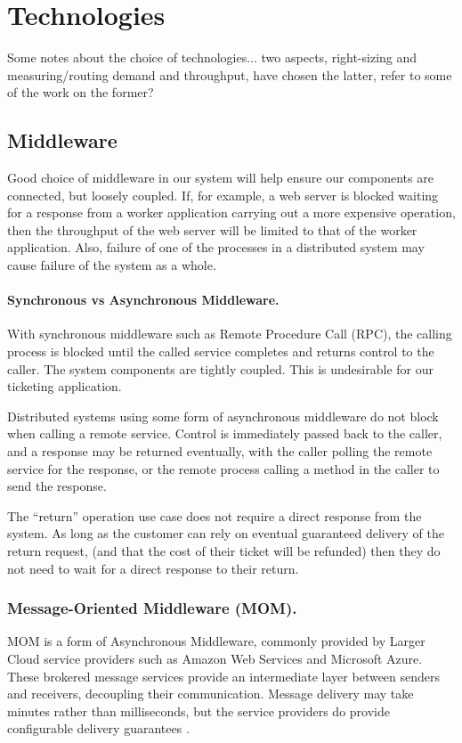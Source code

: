 %
%

\section{Technologies}

Some notes about the choice of technologies... two aspects, right-sizing and measuring/routing demand and throughput, have chosen the latter, refer to some of the work on the former?

%
%

\subsection{Middleware}

Good choice of middleware in our system will help ensure our components are connected, but loosely coupled.  If, for example, a web server is blocked waiting for a response from a worker application carrying out a more expensive operation, then the throughput of the web server will be limited to that of the worker application.  Also, failure of one of the processes in a distributed system may cause failure of the system as a whole.

\paragraph{Synchronous vs Asynchronous Middleware.}
With synchronous middleware such as Remote Procedure Call (RPC), the calling process is blocked until the called service completes and returns control to the caller.  The system components are tightly coupled.  This is undesirable for our ticketing application.

Distributed systems using some form of asynchronous middleware do not block when calling a remote service.  Control is immediately passed back to the caller, and a response may be returned eventually, with the caller polling the remote service for the response, or the remote process calling a method in the caller to send the response.

The ``return'' operation use case does not require a direct response from the system.  As long as the customer can rely on eventual guaranteed delivery of the return request, (and that the cost of their ticket will be refunded) then they do not need to wait for a direct response to their return.

\subsubsection{Message-Oriented Middleware (MOM).}  MOM is a form of Asynchronous Middleware, commonly provided by Larger Cloud service providers such as Amazon Web Services and Microsoft Azure.  These brokered message services provide an intermediate layer between senders and receivers, decoupling their communication.  Message delivery may take minutes rather than milliseconds, but the service providers do provide configurable delivery guarantees \cite{RN65}.


